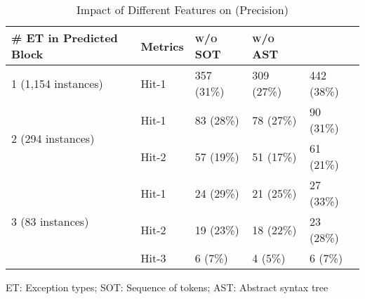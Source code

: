\begin{table}[t]
	\caption{Impact of Different Features on {\xtype} (Precision)}
	\vspace{-10pt}
	\tabcolsep 2pt
	{\small
		\begin{center}
			\renewcommand{\arraystretch}{1}
			\begin{tabular}{p{2cm}<{\centering}|p{1cm}<{\centering}|p{1.5cm}<{\centering}|p{1.5cm}<{\centering}|p{1.5cm}<{\centering}}
				\hline
				\# ET in Predicted \code{Try-Catch} Block & Metrics &{\textsc{\tool w/o SOT}\xspace}&{\textsc{\tool w/o AST}\xspace}& {\textsc{\tool}\xspace} \\
				\hline
				\multirow{1}{*}{1 (1,154 instances)}   & Hit-1  &357 (31\%)& 309 (27\%)& 442 (38\%) \\
				\hline
				\multirow{2}{*}{2 (294 instances)}  & Hit-1   &83 (28\%)& 78 (27\%)& 90 (31\%) \\
				& Hit-2       						&57 (19\%)& 51 (17\%)& 61 (21\%) \\
				\hline
				\multirow{3}{*}{3 (83 instances)}  & Hit-1    & 24 (29\%)& 21 (25\%)& 27 (33\%) \\
				& Hit-2         					&19 (23\%)& 18 (22\%)& 23 (28\%)\\
				& Hit-3         				  	&6 (7\%)& 4 (5\%)& 6 (7\%) \\
				\hline
			\end{tabular}
		ET: Exception types; SOT: Sequence of tokens; AST: Abstract syntax tree
			\label{tab:sensi-xtype-precision}
		\end{center}
	}
\end{table}



